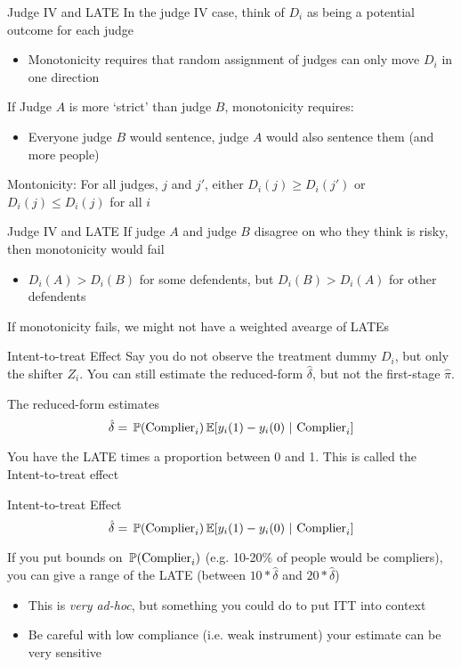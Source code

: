 \documentclass[aspectratio=169,t,11pt,table]{beamer}
\begin{document}
\begin{frame}{Judge IV and LATE}
  In the judge IV case, think of $D_i$ as being a potential outcome for each judge
  \begin{itemize}
    \item Monotonicity requires that random assignment of judges can only move $D_i$ in one direction
  \end{itemize}

  \bigskip
  If Judge $A$ is more `strict' than judge $B$, monotonicity requires:
  \begin{itemize}
    \item Everyone judge $B$ would sentence, judge $A$ would also sentence them (and more people)
  \end{itemize}

  \pause
  \bigskip
  \alert{Montonicity:} For all judges, $j$ and $j'$, either $D_i(j) \geq D_i(j')$ or $D_i(j) \leq D_i(j)$ for all $i$
\end{frame}

\begin{frame}{Judge IV and LATE}
  If judge $A$ and judge $B$ disagree on who they think is risky, then monotonicity would fail
  \begin{itemize}
    \item $D_i(A) > D_i(B)$ for some defendents, but $D_i(B) > D_i(A)$ for other defendents
  \end{itemize}

  \bigskip If monotonicity fails, we might not have a weighted avearge of LATEs
\end{frame}


\begin{frame}{Intent-to-treat Effect}
  Say you do not observe the treatment dummy $D_i$, but only the shifter $Z_i$. 
  You can still estimate the reduced-form $\hat{\delta}$, but not the first-stage $\hat{\pi}$.

  \pause
  \bigskip
  The reduced-form estimates 
  $$
    \hat{\delta} = \prob{\text{Complier}_i} \expec{y_i(1) - y_i(0)}{\text{Complier}_i}
  $$

  \bigskip
  You have the LATE times a proportion between 0 and 1. This is called the \alert{Intent-to-treat effect}
\end{frame}

\begin{frame}{Intent-to-treat Effect}
  \vspace*{-\bigskipamount}
  $$
    \hat{\delta} = \prob{\text{Complier}_i} \expec{y_i(1) - y_i(0)}{\text{Complier}_i}
  $$
  
  \bigskip
  If you put bounds on $\prob{\text{Complier}_i}$ (e.g. 10-20\% of people would be compliers), you can give a range of the LATE (between $10 * \hat{\delta}$ and $20 * \hat{\delta}$)
  \begin{itemize}
    \item This is \emph{very ad-hoc}, but something you could do to put ITT into context
    \item Be careful with low compliance (i.e. weak instrument) your estimate can be very sensitive
  \end{itemize}
\end{frame}
\end{document}
